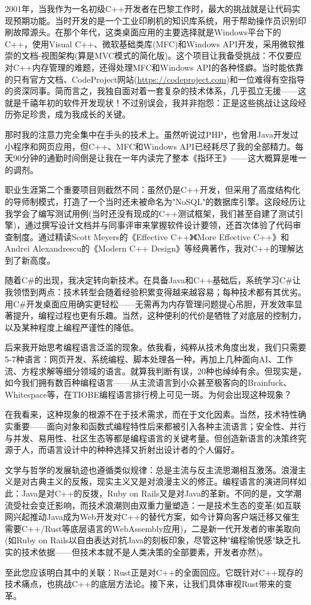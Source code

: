 2001年，当我作为一名初级C++开发者在巴黎工作时，最大的挑战就是让代码实现预期功能。当时开发的是一个工业印刷机的知识库系统，用于帮助操作员识别印刷故障源头。在那个年代，这类桌面应用的主要选择就是Windows平台下的C++，使用Visual C++、微软基础类库(MFC)和Windows API开发，采用微软推崇的文档-视图架构(算是MVC模式的简化版)。这个项目让我备受挑战：不仅要应对C++内存管理的难题，还得处理MFC和Windows API的各种怪癖。当时能依靠的只有官方文档、CodeProject网站(\url{https://codeproject.com})和一位难得有空指导的资深同事。简而言之，我独自面对着一套复杂的技术体系，几乎孤立无援——这就是千禧年初的软件开发现状！不过别误会，我并非抱怨：正是这些挑战让这段经历弥足珍贵，成为我成长的关键。

那时我的注意力完全集中在手头的技术上。虽然听说过PHP，也曾用Java开发过小程序和网页应用，但C++、MFC和Windows API已经耗尽了我的全部精力。每天90分钟的通勤时间倒是让我在一年内读完了整本《指环王》——这大概算是唯一的调剂。

职业生涯第二个重要项目则截然不同：虽然仍是C++开发，但采用了高度结构化的导师制模式，打造了一个当时还未被命名为"NoSQL"的数据库引擎。这段经历让我学会了编写测试用例(当时还没有现成的C++测试框架，我们甚至自建了测试引擎)，通过撰写设计文档并与同事评审来掌握软件设计要领，还首次体验了代码审查制度。通过精读Scott Meyers的《Effective C++》《More Effective C++》和Andrei Alexandrescu的《Modern C++ Design》等经典著作，我对C++的理解达到了新高度。

随着C\#的出现，我决定转向新技术。在具备Java和C++基础后，系统学习C\#让我领悟到两点：技术转型会随着经验积累变得越来越容易；每种技术都有其优劣。用C\#开发桌面应用确实更轻松——无需再为内存管理问题提心吊胆，开发效率显著提升，编程过程也更有乐趣。当然，这种便利的代价是牺牲了对底层的控制力，以及某种程度上编程严谨性的降低。

后来我开始思考编程语言泛滥的现象。依我看，纯粹从技术角度出发，我们只需要5-7种语言：网页开发、系统编程、脚本处理各一种，再加上几种面向AI、工作流、方程求解等细分领域的语言。就算我判断有误，20种也绰绰有余。但现实是，如今我们拥有数百种编程语言——从主流语言到小众甚至极客向的Brainfuck、Whitespace等，在TIOBE编程语言排行榜上可见一斑。为何会出现这种现象？

在我看来，这种现象的根源不在于技术需求，而在于文化因素。当然，技术特性确实重要——面向对象和函数式编程特性后来都被引入各种主流语言；安全性、并行与并发、易用性、社区生态等都是编程语言的关键考量。但创造新语言的决策终究源于人，而语言设计中的种种选择又折射出设计者的个人偏好。

文学与哲学的发展轨迹也遵循类似规律：总是主流与反主流思潮相互激荡。浪漫主义是对古典主义的反叛，现实主义又是对浪漫主义的修正。编程语言的演进同样如此：Java是对C++的反拨，Ruby on Rails又是对Java的革新。不同的是，文学潮流受社会变迁影响，而技术浪潮则由双重力量塑造：一是技术生态的变革(如互联网兴起推动Java成为Web开发对C++的替代方案，如今计算向客户端迁移又催生需要C++/Rust等底层语言的WebAssembly应用)，二是新一代开发者的审美取向(如Ruby on Rails以自由表达对抗Java的刻板印象，尽管这种"编程愉悦感"缺乏扎实的技术依据——但技术本就不是人类决策的全部要素，开发者亦然)。

至此您应该明白其中的关联：Rust正是对C++的全面回应。它既针对C++现存的技术痛点，也挑战C++的底层方法论。接下来，让我们具体审视Rust带来的变革。













